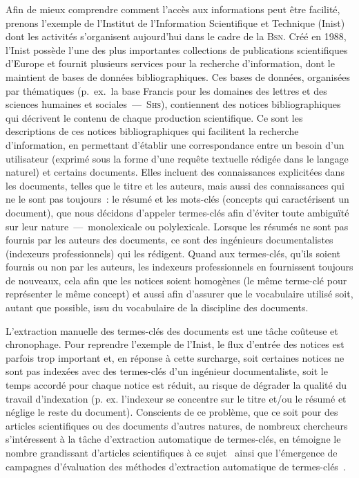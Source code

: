       Afin de mieux comprendre comment l'accès aux informations peut être
      facilité, prenons l'exemple de l'Institut de l'Information Scientifique et
      Technique (Inist) dont les activités s'organisent aujourd'hui dans le
      cadre de la \textsc{Bsn}. Créé en 1988, l'Inist possède l'une des plus
      importantes collections de publications scientifiques d'Europe et fournit
      plusieurs services pour la recherche d'information, dont le maintient de
      bases de données bibliographiques. Ces bases de données, organisées par
      thématiques (p.~ex.~la base Francis pour les domaines des lettres et des
      sciences humaines et sociales~---~\textsc{Shs}), contiennent des notices
      bibliographiques qui décrivent le contenu de chaque production
      scientifique. Ce sont les descriptions de ces notices bibliographiques qui
      facilitent la recherche d'information, en permettant d'établir une
      correspondance entre un besoin d'un utilisateur (exprimé sous la forme
      d'une requête textuelle rédigée dans le langage naturel) et certains
      documents. Elles incluent des connaissances explicitées dans les
      documents, telles que le titre et les auteurs, mais aussi des
      connaissances qui ne le sont pas toujours~: le résumé et les mots-clés
      (concepts qui caractérisent un document), que nous décidons d'appeler
      termes-clés afin d'éviter toute ambiguïté sur leur nature~---~monolexicale
      ou polylexicale. Lorsque les résumés ne sont pas fournis par les auteurs
      des documents, ce sont des ingénieurs documentalistes (indexeurs
      professionnels) qui les rédigent. Quand aux termes-clés, qu'ils soient
      fournis ou non par les auteurs, les indexeurs professionnels en
      fournissent toujours de nouveaux, cela afin que les notices soient
      homogènes (le même terme-clé pour représenter le même concept) et aussi
      afin d'assurer que le vocabulaire utilisé soit, autant que possible, issu
      du vocabulaire de la discipline des documents.

      L'extraction manuelle des termes-clés des documents est une tâche coûteuse
      et chronophage. Pour reprendre l'exemple de l'Inist, le flux d'entrée des
      notices est parfois trop important et, en réponse à cette surcharge, soit
      certaines notices ne sont pas indexées avec des termes-clés d'un ingénieur
      documentaliste, soit le temps accordé pour chaque notice est réduit, au
      risque de dégrader la qualité du travail d'indexation (p. ex. l'indexeur
      se concentre sur le titre et/ou le résumé et néglige le reste du
      document). Conscients de ce problème, que ce soit pour des articles
      scientifiques ou des documents d'autres natures, de nombreux chercheurs
      s'intéressent à la tâche d'extraction automatique de termes-clés, en
      témoigne le nombre grandissant d'articles scientifiques à ce
      sujet~\citep{hasan2014state_of_the_art} ainsi que l'émergence de campagnes
      d'évaluation des méthodes d'extraction automatique de
      termes-clés~\citep{kim2010semeval,paroubek2012deft}.

